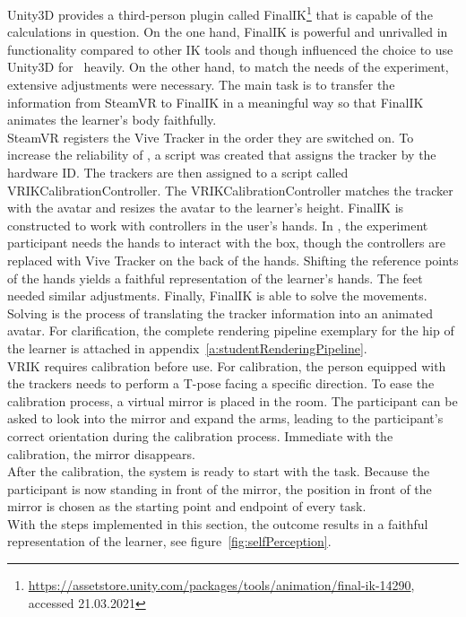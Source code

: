 Unity3D provides a third-person plugin called FinalIK\footnote{\href{https://assetstore.unity.com/packages/tools/animation/final-ik-14290}{https://assetstore.unity.com/packages/tools/animation/final-ik-14290}, accessed 21.03.2021} that is capable of the calculations in question. On the one hand, FinalIK is powerful and unrivalled in functionality compared to other IK tools and though influenced the choice to use Unity3D for \exgo\ heavily. On the other hand, to match the needs of the experiment, extensive adjustments were necessary. The main task is to transfer the information from SteamVR to FinalIK in a meaningful way so that FinalIK animates the learner's body faithfully.\\
SteamVR registers the Vive Tracker in the order they are switched on. To increase the reliability of \exgo, a script was created that assigns the tracker by the hardware ID. The trackers are then assigned to a script called VRIKCalibrationController. The VRIKCalibrationController matches the tracker with the avatar and resizes the avatar to the learner's height. FinalIK is constructed to work with controllers in the user's hands. In \exgo, the experiment participant needs the hands to interact with the box, though the controllers are replaced with Vive Tracker on the back of the hands. Shifting the reference points of the hands yields a faithful representation of the learner's hands. The feet needed similar adjustments. Finally, FinalIK is able to solve the movements. Solving is the process of translating the tracker information into an animated avatar. For clarification, the complete rendering pipeline exemplary for the hip of the learner is attached in appendix~\ref{a:studentRenderingPipeline}.\\
VRIK requires calibration before use. For calibration, the person equipped with the trackers needs to perform a T-pose facing a specific direction. To ease the calibration process, a virtual mirror is placed in the room. The participant can be asked to look into the mirror and expand the arms, leading to the participant's correct orientation during the calibration process. Immediate with the calibration, the mirror disappears.\\
After the calibration, the system is ready to start with the task. Because the participant is now standing in front of the mirror, the position in front of the mirror is chosen as the starting point and endpoint of every task.\\
With the steps implemented in this section, the outcome results in a faithful representation of the learner, see figure~\ref{fig:selfPerception}.\\

